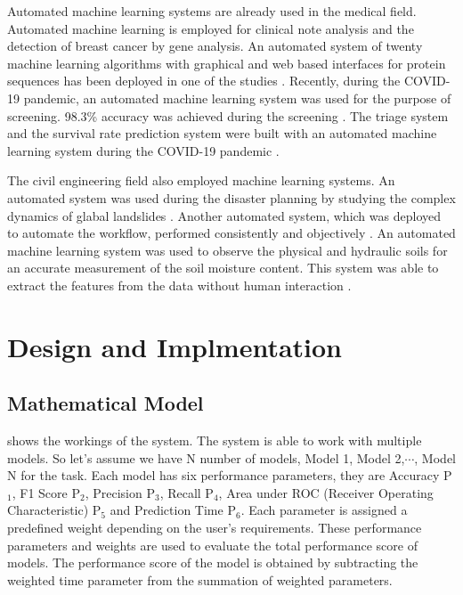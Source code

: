 \documentclass[a4paper,fleqn]{cas-dc}
\begin{document}
Automated machine learning systems are already used in the medical field. Automated machine learning is employed for clinical note analysis \cite{ref_paper_a_2} and the detection of breast cancer \cite{ref_paper_a_6} by gene analysis. An automated system of twenty machine learning algorithms with graphical and web based interfaces for protein sequences has been deployed in one of the studies \cite{ref_paper_a_11}. Recently, during the COVID-19 pandemic, an automated machine learning system was used for the purpose of screening. 98.3\% accuracy was achieved during the screening \cite{ref_paper_a_15}. The triage system and the survival rate prediction system were built with an automated machine learning system during the COVID-19 pandemic \cite{ref_paper_a_9}.

The civil engineering field also employed machine learning systems. An automated system was used during the disaster planning by studying the complex dynamics of glabal landslides \cite{ref_paper_a_10}. Another automated system, which was deployed to automate the workflow, performed consistently and objectively \cite{ref_paper_a_13}. An automated machine learning system was used to observe the physical and hydraulic soils for an accurate measurement of the soil moisture content. This system was able to extract the features from the data without human interaction \cite{ref_paper_a_8}.

\section{Design and Implmentation}\label{sec:design_and_implmentation}

\subsection{Mathematical Model}\label{subsec:mathematical_model}

 shows the workings of the system. The system is able to work with multiple models. So let's assume we have N number of models, Model 1, Model 2,$\cdots$, Model N for the task. Each model has six performance parameters, they are Accuracy P$_1$, F1 Score P$_2$, Precision P$_3$, Recall P$_4$, Area under ROC (Receiver Operating Characteristic) P$_5$ and Prediction Time P$_6$. Each parameter is assigned a predefined weight depending on the user's requirements. These performance parameters and weights are used to evaluate the total performance score of models. The performance score of the model is obtained by subtracting the weighted time parameter from the summation of weighted parameters.
\end{document}
